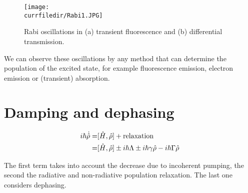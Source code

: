 \begin{figure} 
    \centering
    \texttt{[image: \\currfiledir/Rabi1.JPG]}
    \caption{Rabi oscillations in (a) transient fluorescence and (b) differential transmission.}
    \label{fig:Rabi}
\end{figure}

We can observe these oscillations by any method that can determine the population of the excited state, for example fluorescence emission, electron emission or (transient) absorption.




\section{Damping and dephasing}


\begin{align*}
    i\hbar \dot{\hat{\rho}} =& [\hat{H},\hat{\rho}] + \text{relaxation}
     \notag\\
    =& [\hat{H},\hat{\rho}] \pm i\hbar\Lambda \pm i\hbar\gamma \hat{\rho} - i\hbar \Gamma \hat{\rho}
\end{align*}


The first term takes into account the decrease due to incoherent pumping, the second the radiative and non-radiative population relaxation. The last one considers dephasing. 





\printbibliography[segment=\therefsegment,heading=subbibliography]

